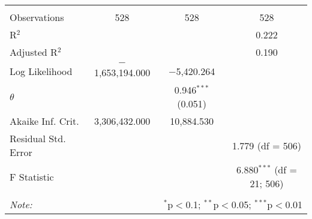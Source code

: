 \begin{table}[!htbp]
\begin{tabular}{@{\extracolsep{5pt}}lccc}
 \hline \\[-1.8ex] 
Observations & 528 & 528 & 528 \\ 
R$^{2}$ &  &  & 0.222 \\ 
Adjusted R$^{2}$ &  &  & 0.190 \\ 
Log Likelihood & $-$1,653,194.000 & $-$5,420.264 &  \\ 
$\theta$ &  & 0.946$^{***}$  (0.051) &  \\ 
Akaike Inf. Crit. & 3,306,432.000 & 10,884.530 &  \\ 
Residual Std. Error &  &  & 1.779 (df = 506) \\ 
F Statistic &  &  & 6.880$^{***}$ (df = 21; 506) \\ 
\hline 
\hline \\[-1.8ex] 
\textit{Note:}  & \multicolumn{3}{r}{$^{*}$p$<$0.1; $^{**}$p$<$0.05; $^{***}$p$<$0.01} \\ 
\end{tabular} 
\end{table} 
